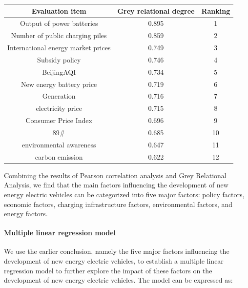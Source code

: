 \documentclass{apmcmthesis}
\begin{document}
\begin{longtable}{ccc}
    \hline
    Evaluation item                           & Grey relational degree & Ranking \\ \hline
    Output of power batteries                 & 0.895                  & 1       \\
    Number of public charging piles		      & 0.859                  & 2       \\
    International energy market prices        & 0.749                  & 3       \\
    Subsidy policy                            & 0.746                  & 4       \\
    BeijingAQI                                & 0.734                  & 5       \\
    New energy battery price                  & 0.719                  & 6       \\
    Generation                                & 0.716                  & 7      \\
    electricity price                         & 0.715                  & 8      \\
    Consumer Price Index                      & 0.696                  & 9      \\
    89\#                                      & 0.685                  & 10      \\
    environmental awareness                   & 0.647                  & 11      \\
    carbon emission                           & 0.622                  & 12     
\end{longtable}
Combining the results of Pearson correlation analysis and Grey Relational Analysis, we find that the main factors influencing the development of new energy electric vehicles can be categorized into five major factors: policy factors, economic factors, charging infrastructure factors, environmental factors, and energy factors.

\paragraph{Multiple linear regression model}
We use the earlier conclusion, namely the five major factors influencing the development of new energy electric vehicles, to establish a multiple linear regression model to further explore the impact of these factors on the development of new energy electric vehicles. The model can be expressed as:
\end{document}
